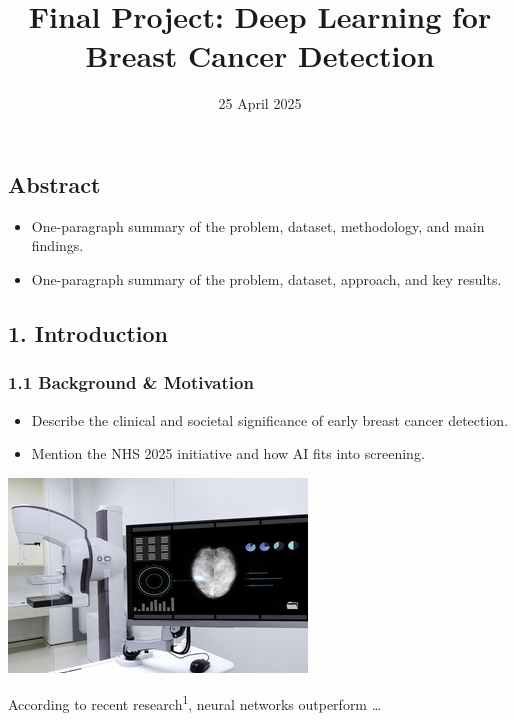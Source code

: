 \documentclass[
  12pt,
  letterpaper,
  DIV=11,
  numbers=noendperiod]{scrartcl}
\title{Final Project: Deep Learning for Breast Cancer Detection}
\author{Takeshi Fujii, MD \and }
\date{25 April 2025}
\providecommand{\tightlist}{%
  \setlength{\itemsep}{0pt}\setlength{\parskip}{0pt}}
\renewcommand*\contentsname{Table of contents}
\newcommand\contentsname{Table of contents}
\begin{document}
\maketitle

\renewcommand*\contentsname{Table of contents}
{
\hypersetup{linkcolor=}
\setcounter{tocdepth}{3}
\tableofcontents
}

\subsection{Abstract}\label{abstract}

\begin{itemize}
\tightlist
\item
  One-paragraph summary of the problem, dataset, methodology, and main
  findings.
\item
  One-paragraph summary of the problem, dataset, approach, and key
  results.
\end{itemize}

\subsection{1. Introduction}\label{introduction}

\subsubsection{1.1 Background \&
Motivation}\label{background-motivation}

\begin{itemize}
\tightlist
\item
  Describe the clinical and societal significance of early breast cancer
  detection.
\item
  Mention the NHS 2025 initiative and how AI fits into screening.
\end{itemize}

\includegraphics[width=0.5\linewidth,height=\textheight,keepaspectratio]{figures/mammogram.jpg}

According to recent research\textsuperscript{1}, neural networks
outperform \ldots{}
\end{document}
